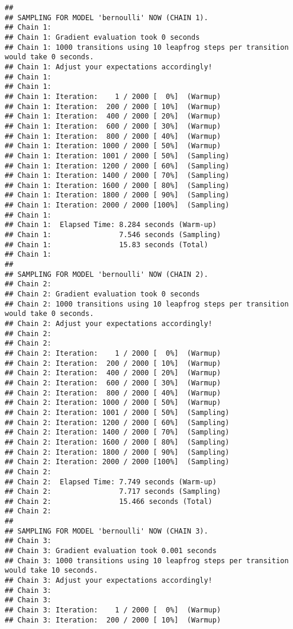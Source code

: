 \documentclass[
]{article}
\begin{document}
\begin{verbatim}
## 
## SAMPLING FOR MODEL 'bernoulli' NOW (CHAIN 1).
## Chain 1: 
## Chain 1: Gradient evaluation took 0 seconds
## Chain 1: 1000 transitions using 10 leapfrog steps per transition would take 0 seconds.
## Chain 1: Adjust your expectations accordingly!
## Chain 1: 
## Chain 1: 
## Chain 1: Iteration:    1 / 2000 [  0%]  (Warmup)
## Chain 1: Iteration:  200 / 2000 [ 10%]  (Warmup)
## Chain 1: Iteration:  400 / 2000 [ 20%]  (Warmup)
## Chain 1: Iteration:  600 / 2000 [ 30%]  (Warmup)
## Chain 1: Iteration:  800 / 2000 [ 40%]  (Warmup)
## Chain 1: Iteration: 1000 / 2000 [ 50%]  (Warmup)
## Chain 1: Iteration: 1001 / 2000 [ 50%]  (Sampling)
## Chain 1: Iteration: 1200 / 2000 [ 60%]  (Sampling)
## Chain 1: Iteration: 1400 / 2000 [ 70%]  (Sampling)
## Chain 1: Iteration: 1600 / 2000 [ 80%]  (Sampling)
## Chain 1: Iteration: 1800 / 2000 [ 90%]  (Sampling)
## Chain 1: Iteration: 2000 / 2000 [100%]  (Sampling)
## Chain 1: 
## Chain 1:  Elapsed Time: 8.284 seconds (Warm-up)
## Chain 1:                7.546 seconds (Sampling)
## Chain 1:                15.83 seconds (Total)
## Chain 1: 
## 
## SAMPLING FOR MODEL 'bernoulli' NOW (CHAIN 2).
## Chain 2: 
## Chain 2: Gradient evaluation took 0 seconds
## Chain 2: 1000 transitions using 10 leapfrog steps per transition would take 0 seconds.
## Chain 2: Adjust your expectations accordingly!
## Chain 2: 
## Chain 2: 
## Chain 2: Iteration:    1 / 2000 [  0%]  (Warmup)
## Chain 2: Iteration:  200 / 2000 [ 10%]  (Warmup)
## Chain 2: Iteration:  400 / 2000 [ 20%]  (Warmup)
## Chain 2: Iteration:  600 / 2000 [ 30%]  (Warmup)
## Chain 2: Iteration:  800 / 2000 [ 40%]  (Warmup)
## Chain 2: Iteration: 1000 / 2000 [ 50%]  (Warmup)
## Chain 2: Iteration: 1001 / 2000 [ 50%]  (Sampling)
## Chain 2: Iteration: 1200 / 2000 [ 60%]  (Sampling)
## Chain 2: Iteration: 1400 / 2000 [ 70%]  (Sampling)
## Chain 2: Iteration: 1600 / 2000 [ 80%]  (Sampling)
## Chain 2: Iteration: 1800 / 2000 [ 90%]  (Sampling)
## Chain 2: Iteration: 2000 / 2000 [100%]  (Sampling)
## Chain 2: 
## Chain 2:  Elapsed Time: 7.749 seconds (Warm-up)
## Chain 2:                7.717 seconds (Sampling)
## Chain 2:                15.466 seconds (Total)
## Chain 2: 
## 
## SAMPLING FOR MODEL 'bernoulli' NOW (CHAIN 3).
## Chain 3: 
## Chain 3: Gradient evaluation took 0.001 seconds
## Chain 3: 1000 transitions using 10 leapfrog steps per transition would take 10 seconds.
## Chain 3: Adjust your expectations accordingly!
## Chain 3: 
## Chain 3: 
## Chain 3: Iteration:    1 / 2000 [  0%]  (Warmup)
## Chain 3: Iteration:  200 / 2000 [ 10%]  (Warmup)

\end{verbatim}
\end{document}
